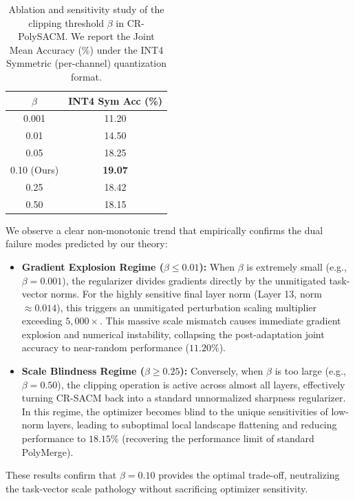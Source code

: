 \begin{table}[h]
\caption{Ablation and sensitivity study of the clipping threshold $\beta$ in CR-PolySACM. We report the Joint Mean Accuracy (\%) under the INT4 Symmetric (per-channel) quantization format.}
\label{tab:beta_ablation}
\begin{center}
\begin{small}
\begin{sc}
\begin{tabular}{cc}
\toprule
$\beta$ & INT4 Sym Acc (\%) \\
\midrule
0.001 & 11.20 \\
0.01 & 14.50 \\
0.05 & 18.25 \\
0.10 (Ours) & \textbf{19.07} \\
0.25 & 18.42 \\
0.50 & 18.15 \\
\bottomrule
\end{tabular}
\end{sc}
\end{small}
\end{center}
\end{table}

We observe a clear non-monotonic trend that empirically confirms the dual failure modes predicted by our theory:
\begin{itemize}
    \item \textbf{Gradient Explosion Regime ($\beta \le 0.01$):} When $\beta$ is extremely small (e.g., $\beta = 0.001$), the regularizer divides gradients directly by the unmitigated task-vector norms. For the highly sensitive final layer norm (Layer 13, norm $\approx 0.014$), this triggers an unmitigated perturbation scaling multiplier exceeding $5,000 \times$. This massive scale mismatch causes immediate gradient explosion and numerical instability, collapsing the post-adaptation joint accuracy to near-random performance ($11.20\%$).
    \item \textbf{Scale Blindness Regime ($\beta \ge 0.25$):} Conversely, when $\beta$ is too large (e.g., $\beta = 0.50$), the clipping operation is active across almost all layers, effectively turning CR-SACM back into a standard unnormalized sharpness regularizer. In this regime, the optimizer becomes blind to the unique sensitivities of low-norm layers, leading to suboptimal local landscape flattening and reducing performance to $18.15\%$ (recovering the performance limit of standard PolyMerge).
\end{itemize}
These results confirm that $\beta = 0.10$ provides the optimal trade-off, neutralizing the task-vector scale pathology without sacrificing optimizer sensitivity.

